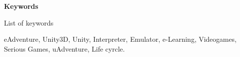 \vspace{1cm}


\begin{center}

{\bf \Large Keywords}

   \end{center}

   \vspace{0.5cm}
   
List of keywords
   
eAdventure, Unity3D, Unity, Interpreter, Emulator, e-Learning, Videogames, Serious Games, uAdventure, Life cyrcle.

